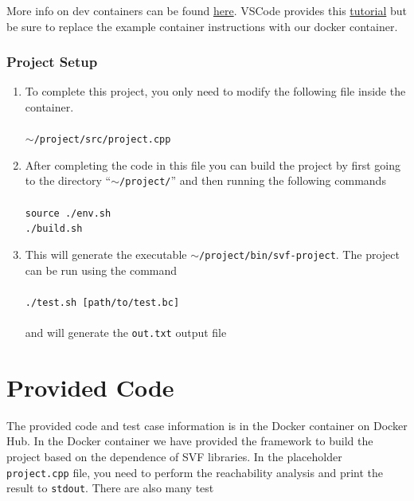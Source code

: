 \documentclass[12pt]{article}
\newcommand{\codeIn}[1]{{\small\tt{#1}}}
\newcommand{\implementationFile}{\codeIn{project.cpp} }
\begin{document}
\begin{enumerate}
    More info on dev containers can be found \href{https://code.visualstudio.com/docs/devcontainers/containers}{here}. VSCode provides this \href{https://code.visualstudio.com/docs/devcontainers/tutorial}{tutorial} but be sure to replace the example container instructions with our docker container.
    
\end{enumerate}

\subsubsection{Project Setup}
\begin{enumerate}
    \item To complete this project, you only need to modify the following file inside the container.\\\\
    \codeIn{$\sim$/project/src/project.cpp}\\
    
    \item After completing the code in this file you can build the project by first going to the directory ``\codeIn{$\sim$/project/}'' and then running the following commands\\\\
    \codeIn{source ./env.sh}\\
    \codeIn{./build.sh}\\

    \item This will generate the executable \codeIn{$\sim$/project/bin/svf-project}. The project can be run using the command\\\\    
    \codeIn{./test.sh [path/to/test.bc]}\\\\
    and will generate the \codeIn{out.txt} output file
    

\end{enumerate}
\section{Provided Code}

The provided code and test case information is in the Docker container on Docker Hub. In the Docker container we have provided the framework to build the project based on the dependence of SVF libraries. In the placeholder \implementationFile file, you need to perform the reachability analysis and print the result to \codeIn{stdout}. There are also many test
\end{document}
